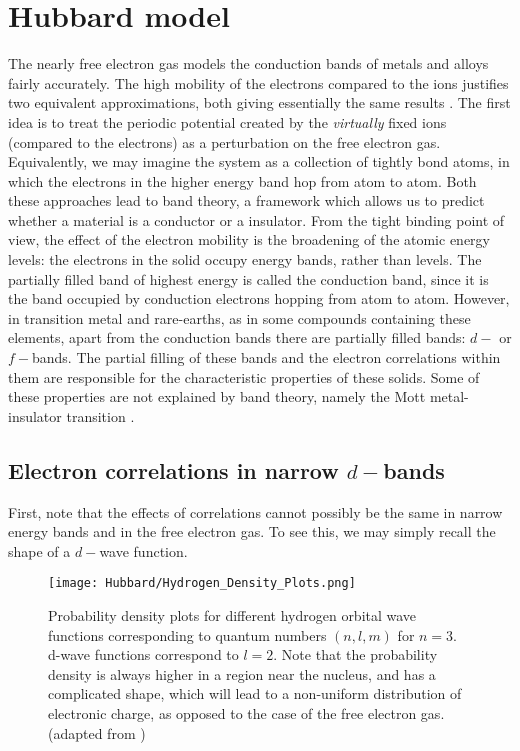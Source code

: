 \section{Hubbard model}\label{sec:hubbardModel}

The nearly free electron gas models the conduction bands of metals and alloys fairly accurately.
The high mobility of the electrons compared to the ions justifies two equivalent approximations, both giving essentially the same results \cite{ashcroft_solid_1976}.
The first idea is to treat the periodic potential created by the \emph{virtually} fixed ions (compared to the electrons) as a perturbation on the free electron gas.
Equivalently, we may imagine the system as a collection of tightly bond atoms, in which the electrons in the higher energy band hop from atom to atom.
Both these approaches lead to band theory, a framework which allows us to predict whether a material is a conductor or a insulator.
From the tight binding point of view, the effect of the electron mobility is the broadening of the atomic energy levels: the electrons in the solid occupy energy bands, rather than levels.
The partially filled band of highest energy is called the conduction band, since it is the band occupied by conduction electrons hopping from atom to atom.
However, in transition metal and rare-earths, as in some compounds containing these elements, apart from the conduction bands there are partially filled bands: $d-$ or $f-$bands.
The partial filling of these bands and the electron correlations within them are responsible for the characteristic properties of these solids.
Some of these properties are not explained by band theory, namely the Mott metal-insulator transition \cite{h_de_boer_semiconductors_1937, mott_discussion_1937, mott_basis_1949}.

\subsection{Electron correlations in narrow $d-$bands}

First, note that the effects of correlations cannot possibly be the same in narrow energy bands and in the free electron gas.
To see this, we may simply recall the shape of a $d-$wave function.

\begin{figure}[H]\label{fig:hydrogenWF}
\centering
\texttt{[image: Hubbard/Hydrogen\_Density\_Plots.png]}
\caption[Hydrogen atomic wave functions.]{Probability density plots for different hydrogen orbital wave functions corresponding to quantum numbers $(n, l, m)$ for $n = 3$.
d-wave functions correspond to $l=2$. Note that the probability density is always higher in a region near the nucleus, and has a complicated shape, which will lead to a non-uniform distribution of electronic charge, as opposed to the case of the free electron gas. (adapted from \cite{hydrogen})}
\end{figure}

